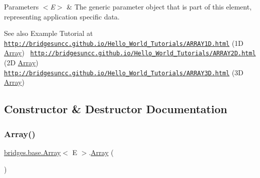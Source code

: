 \begin{DoxyParams}{Parameters}
{\em $<$\+E$>$} & The generic parameter object that is part of this element, representing application specific data.\\
\hline
\end{DoxyParams}
\begin{DoxySeeAlso}{See also}
Example Tutorial at ~\newline
 \href{http://bridgesuncc.github.io/Hello_World_Tutorials/ARRAY1D.html}{\tt http\+://bridgesuncc.\+github.\+io/\+Hello\+\_\+\+World\+\_\+\+Tutorials/\+A\+R\+R\+A\+Y1\+D.\+html} (1D \mbox{\hyperlink{classbridges_1_1base_1_1_array}{Array}})~\newline
 \href{http://bridgesuncc.github.io/Hello_World_Tutorials/ARRAY2D.html}{\tt http\+://bridgesuncc.\+github.\+io/\+Hello\+\_\+\+World\+\_\+\+Tutorials/\+A\+R\+R\+A\+Y2\+D.\+html} (2D \mbox{\hyperlink{classbridges_1_1base_1_1_array}{Array}})~\newline
 \href{http://bridgesuncc.github.io/Hello_World_Tutorials/ARRAY3D.html}{\tt http\+://bridgesuncc.\+github.\+io/\+Hello\+\_\+\+World\+\_\+\+Tutorials/\+A\+R\+R\+A\+Y3\+D.\+html} (3D \mbox{\hyperlink{classbridges_1_1base_1_1_array}{Array}}) 
\end{DoxySeeAlso}


\subsection{Constructor \& Destructor Documentation}
\mbox{\label{classbridges_1_1base_1_1_array_ad5dbf7bbd9811c2dac16a5c135465d4b}} 
\subsubsection{\texorpdfstring{Array()}{Array()}\hspace{0.1cm}{\footnotesize\ttfamily [1/5]}}
{\footnotesize\ttfamily \mbox{\hyperlink{classbridges_1_1base_1_1_array}{bridges.\+base.\+Array}}$<$ E $>$.\mbox{\hyperlink{classbridges_1_1base_1_1_array}{Array}} (\begin{DoxyParamCaption}{ }\end{DoxyParamCaption})}

\mbox{\label{classbridges_1_1base_1_1_array_ab37dbe6efe0c34242456971e430763f7}} 

